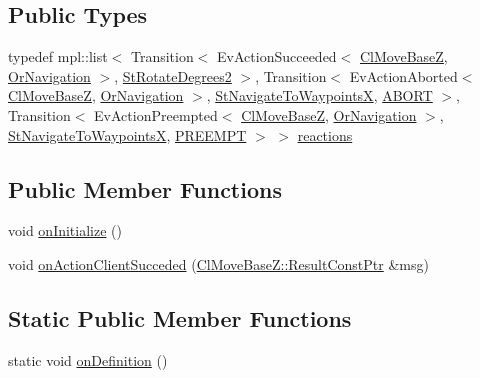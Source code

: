 \subsection*{Public Types}
\begin{DoxyCompactItemize}
\item 
typedef mpl\+::list$<$ Transition$<$ Ev\+Action\+Succeeded$<$ \hyperlink{classmove__base__z__client_1_1ClMoveBaseZ}{Cl\+Move\+BaseZ}, \hyperlink{classsm__dance__bot_1_1OrNavigation}{Or\+Navigation} $>$, \hyperlink{structsm__dance__bot_1_1StRotateDegrees2}{St\+Rotate\+Degrees2} $>$, Transition$<$ Ev\+Action\+Aborted$<$ \hyperlink{classmove__base__z__client_1_1ClMoveBaseZ}{Cl\+Move\+BaseZ}, \hyperlink{classsm__dance__bot_1_1OrNavigation}{Or\+Navigation} $>$, \hyperlink{structsm__dance__bot_1_1StNavigateToWaypointsX}{St\+Navigate\+To\+WaypointsX}, \hyperlink{classABORT}{A\+B\+O\+RT} $>$, Transition$<$ Ev\+Action\+Preempted$<$ \hyperlink{classmove__base__z__client_1_1ClMoveBaseZ}{Cl\+Move\+BaseZ}, \hyperlink{classsm__dance__bot_1_1OrNavigation}{Or\+Navigation} $>$, \hyperlink{structsm__dance__bot_1_1StNavigateToWaypointsX}{St\+Navigate\+To\+WaypointsX}, \hyperlink{classPREEMPT}{P\+R\+E\+E\+M\+PT} $>$ $>$ \hyperlink{structsm__dance__bot_1_1StNavigateForward1_a4a49d0c774d44f96b17ceac4c6628104}{reactions}
\end{DoxyCompactItemize}
\subsection*{Public Member Functions}
\begin{DoxyCompactItemize}
\item 
void \hyperlink{structsm__dance__bot_1_1StNavigateForward1_aca9caa8bd74d17b2d735db4cfb3cfe4c}{on\+Initialize} ()
\item 
void \hyperlink{structsm__dance__bot_1_1StNavigateForward1_a82cc8f8303c3b090edfe3b8e6c807b77}{on\+Action\+Client\+Succeded} (\hyperlink{classmove__base__z__client_1_1ClMoveBaseZ_a3b774d99d3dd4526f99b968d65ef5834}{Cl\+Move\+Base\+Z\+::\+Result\+Const\+Ptr} \&msg)
\end{DoxyCompactItemize}
\subsection*{Static Public Member Functions}
\begin{DoxyCompactItemize}
\item 
static void \hyperlink{structsm__dance__bot_1_1StNavigateForward1_a81efc621988f772ae4de92ab9e3130b7}{on\+Definition} ()
\end{DoxyCompactItemize}
